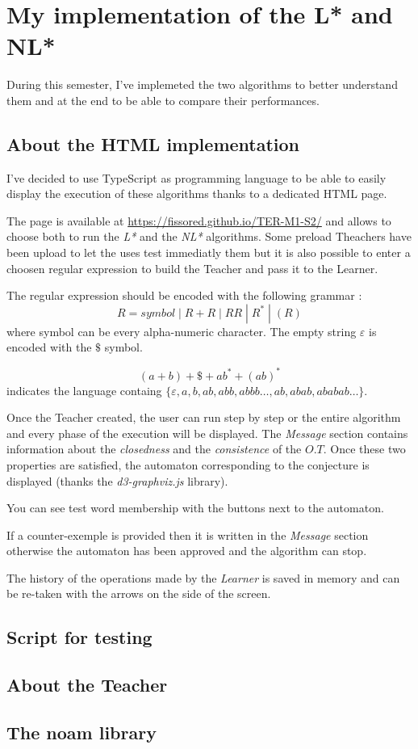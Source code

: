 \section{My implementation of the L* and NL*}
During this semester, I've implemeted the two algorithms to better understand them and at the end to be able to compare their performances.


\subsection{About the HTML implementation}

I've decided to use TypeScript as programming language to be able to easily display the execution of these algorithms thanks to a dedicated HTML page.

The page is available at \url{https://fissored.github.io/TER-M1-S2/} and allows to choose both to run the \textit{L*} and the \textit{NL*} algorithms. Some preload Theachers have been upload to let the uses test immediatly them but it is also possible to enter a choosen regular expression to build the Teacher and pass it to the Learner.

The regular expression should be encoded with the following grammar :
\[ R = symbol \; | \; R + R \; | \; RR \; | \;R^* \; | \;(R) \]
where symbol can be every alpha-numeric character. The empty string $\varepsilon$ is encoded with the $\$$ symbol.

\begin{example}
  \[(a + b)+\$+ab^*+(ab)^*\] indicates the language containg $\{\varepsilon,a, b,  ab, abb, abbb\dots, ab, abab, ababab\dots\}$.
\end{example}

Once the Teacher created, the user can run step by step or the entire algorithm and every phase of the execution will be displayed. The \textit{Message} section contains information about the \textit{closedness} and the \textit{consistence} of the $O.T$. Once these two properties are satisfied, the automaton corresponding to the conjecture is displayed (thanks the \textit{d3-graphviz.js} library).

You can see test word membership with the buttons next to the automaton.

If a counter-exemple is provided then it is written in the \textit{Message} section otherwise the automaton has been approved and the algorithm can stop.

The history of the operations made by the \textit{Learner} is saved in memory and can be re-taken with the arrows on the side of the screen.

\subsection{Script for testing}

\subsection{About the Teacher}

\subsection{The noam library}